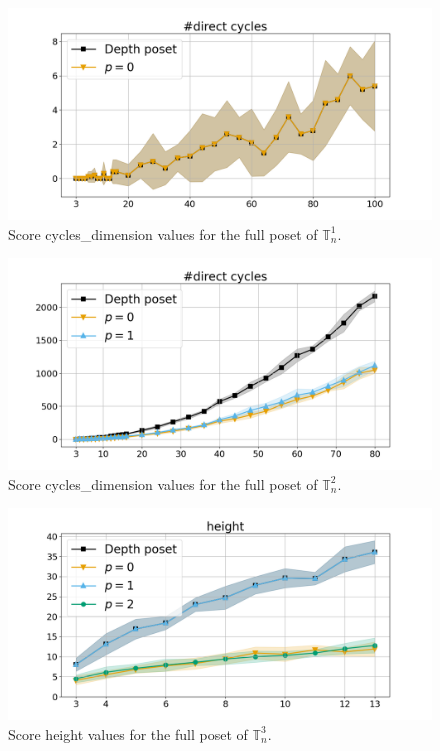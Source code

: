 \documentclass{article}
\begin{document}
    \begin{figure}[h!]
        \centering
        \hspace*{-0.24\textwidth}
        \includegraphics[width=1.4\textwidth]{pics/extended torus scores/score=cycles-dimension, dim=1, object=full.png}
        \caption{Score cycles\_dimension values for the full poset of $\mathbb{T}_n^{1}$.}
        \label{fig:cyclesdimension-full1}
    \end{figure}
    \begin{figure}[h!]
        \centering
        \hspace*{-0.24\textwidth}
        \includegraphics[width=1.4\textwidth]{pics/extended torus scores/score=cycles-dimension, dim=2, object=full.png}
        \caption{Score cycles\_dimension values for the full poset of $\mathbb{T}_n^{2}$.}
        \label{fig:cyclesdimension-full2}
    \end{figure}
    \begin{figure}[h!]
        \centering
        \hspace*{-0.24\textwidth}
        \includegraphics[width=1.4\textwidth]{pics/extended torus scores/score=height, dim=3, object=full.png}
        \caption{Score height values for the full poset of $\mathbb{T}_n^{3}$.}
        \label{fig:height-full3}
    \end{figure}
\end{document}
